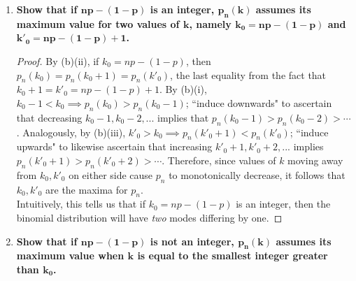 \documentclass[10pt, oneside]{article}   	%
\theoremstyle{definition}
\begin{document}
\begin{enumerate}[label=4.\arabic*]
\begin{enumerate}
\begin{enumerate}
		\begin{proof}
		Equivalently, we demonstrate that $p_n (k+1) / p_n (k) < 1$. Suppose $k > np - (1 - p)$. Then $n - k < n - np + (1-p) = (1 - p)(n + 1)$ and $k + 1 > np - (1 - p) + 1 = p(n+1)$. Then $\frac{n-k}{k+1} < \frac{(1-p)(n+1)}{p(n+1)} = \frac{1-p}{p}$, implying $p_n (k+1) / p_n (k) = \frac{n-k}{k+1} \frac{p}{1-p} < \frac{1-p}{p} \frac{p}{1-p} = 1$.
		\end{proof}
		\end{enumerate}
		
	\item  \begin{tcolorbox}[
	  colback=Cerulean!5!white,
	  colframe=Cerulean!75!black]
	\textbf{Show that if $\bm{np - (1 - p)}$ is an integer, $\bm{p_n (k)}$ assumes its maximum value for two values of $\bm{k}$, namely $\bm{k_0 = np - (1 - p)}$ and $\bm{k'_0 = np - (1 - p) + 1}$.}
	\end{tcolorbox}
	
	\begin{proof}
	By (b)(ii), if $k_0 = np - (1-p)$, then $p_n (k_0) = p_n (k_0 + 1) = p_n (k'_0)$, the last equality from the fact that $k_0 + 1 = k'_0 = np - (1-p) + 1$. By (b)(i), $k_0 - 1 < k_0 \implies p_n(k_0) > p_n(k_0 - 1)$; ``induce downwards" to ascertain that decreasing $k_0 - 1, k_0 - 2,...$ implies that $p_n (k_0 - 1) > p_n (k_0 - 2) > \cdots$. Analogously, by (b)(iii), $k'_0 > k_0 \implies p_n(k'_0 + 1) < p_n(k'_0)$; ``induce upwards" to likewise ascertain that increasing $k'_0 + 1, k'_0 + 2, ...$ implies $p_n (k'_0 + 1) > p_n(k'_0 + 2) > \cdots$. Therefore, since values of $k$ moving away from $k_0, k'_0$ on either side cause $p_n$ to monotonically decrease, it follows that $k_0, k'_0$ are the maxima for $p_n$. \\
	
	Intuitively, this tells us that if $k_0 = np - (1-p)$ is an integer, then the binomial distribution will have \textit{two} modes differing by one.
	\end{proof}
	
	\item  \begin{tcolorbox}[
	  colback=Cerulean!5!white,
	  colframe=Cerulean!75!black]
	\textbf{Show that if $\bm{np - (1 - p)}$ is not an integer, $\bm{p_n (k)}$ assumes its maximum value when $\bm{k}$ is equal to the smallest integer greater than $\bm{k_0}$.}
	\end{tcolorbox}
	

\end{enumerate}
\end{enumerate}
\end{document}
